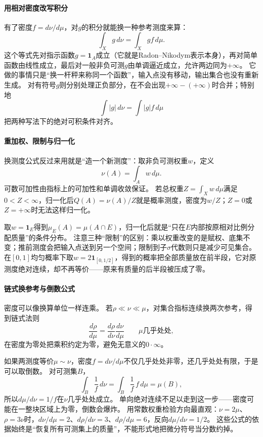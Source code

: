 \paragraph{用相对密度改写积分}

有了密度$f=d\nu/d\mu$，对$g$的积分就能换一种参考测度来算：
\[
 \int_X g\,d\nu=\int_X gf\,d\mu.
\]
这个等式先对指示函数$g=\mathbf 1_A$成立（它就是Radon–Nikodym表示本身），再对简单函数由线性成立，最后对一般非负可测$g$由单调逼近成立，允许两边同为$+\infty$。
它做的事情只是“换一杆秤来称同一个函数”，输入点没有移动，输出集合也没有重新生成。
对有符号$g$则分别处理正负部分，在不会出现$+\infty-(+\infty)$时合并；特别地
\[
 \int|g|\,d\nu=\int|g|f\,d\mu
\]
把两种写法下的绝对可积条件对齐。

\paragraph{重加权、限制与归一化}

换测度公式反过来用就是“造一个新测度”：取非负可测权重$w$，定义
\[
 \nu(A)=\int_Aw\,d\mu.
\]
可数可加性由指标上的可加性和单调收敛保证。
若总权重$Z=\int_Xw\,d\mu$满足$0<Z<\infty$，归一化后$Q(A)=\nu(A)/Z$就是概率测度，密度为$w/Z$；$Z=0$或$Z=+\infty$时无法这样归一化。

取$w=\mathbf 1_E$得到$\mu_E(A)=\mu(A\cap E)$，归一化后就是“只在$E$内部按原相对比例分配质量”的条件分布。
注意三种“限制”的区别：乘以权重改变的是赋权、底集不变；推前测度会把输入点送到另一个空间；限制到子$\sigma$代数则只是减少可见集合。
在$[0,1]$均匀概率下取$w=2\mathbf 1_{[0,1/2]}$，得到的概率把全部质量放在前半段，它对原测度绝对连续，却不再等价——原来有质量的后半段被压成了零。

\paragraph{链式换参考与倒数公式}

密度可以像换算单位一样连乘。
若$\rho\ll\nu\ll\mu$，对集合指标连续换两次参考，得到链式法则
\[
 \frac{d\rho}{d\mu}=\frac{d\rho}{d\nu}\frac{d\nu}{d\mu}
 \qquad\mu\text{几乎处处},
\]
在密度为零处把乘积约定为零，避免无意义的$0\cdot\infty$。

如果两测度等价$\mu\sim\nu$，密度$f=d\nu/d\mu$不仅几乎处处非零，还几乎处处有限，于是可以取倒数。
对可测集$B$，
\[
 \int_B\frac1f\,d\nu=\int_B\frac1f\,f\,d\mu=\mu(B),
\]
所以$d\mu/d\nu=1/f$在$\nu$几乎处处成立。
单向绝对连续不足以走到这一步——密度可能在一整块区域上为零，倒数会爆炸。
用常数权重检验方向最直观：$\nu=2\mu$、$\rho=3\nu$时，$d\nu/d\mu=2$、$d\rho/d\nu=3$、$d\rho/d\mu=6$，反向$d\mu/d\nu=1/2$。
这些公式的依据始终是“恢复所有可测集上的质量”，不能形式地把微分符号当分数约掉。

